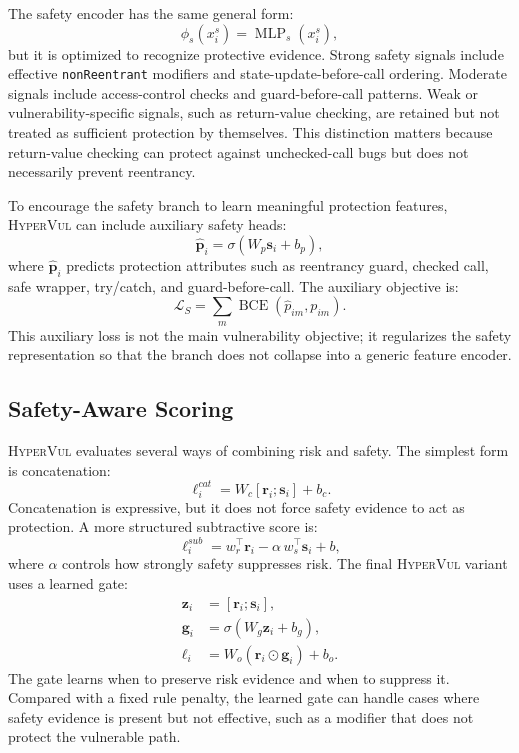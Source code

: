\documentclass[conference]{IEEEtran}
\newcommand{\tool}{\textsc{HyperVul}}
\begin{document}
The safety encoder has the same general form:
\begin{equation}
\phi_s(x_i^s)=\operatorname{MLP}_s(x_i^s),
\end{equation}
but it is optimized to recognize protective evidence. Strong safety signals include effective \texttt{nonReentrant} modifiers and state-update-before-call ordering. Moderate signals include access-control checks and guard-before-call patterns. Weak or vulnerability-specific signals, such as return-value checking, are retained but not treated as sufficient protection by themselves. This distinction matters because return-value checking can protect against unchecked-call bugs but does not necessarily prevent reentrancy.

To encourage the safety branch to learn meaningful protection features, \tool{} can include auxiliary safety heads:
\begin{equation}
\hat{\mathbf{p}}_i=\sigma(W_p\mathbf{s}_i+b_p),
\end{equation}
where $\hat{\mathbf{p}}_i$ predicts protection attributes such as reentrancy guard, checked call, safe wrapper, try/catch, and guard-before-call. The auxiliary objective is:
\begin{equation}
\mathcal{L}_{S}=\sum_m \operatorname{BCE}(\hat{p}_{im},p_{im}).
\end{equation}
This auxiliary loss is not the main vulnerability objective; it regularizes the safety representation so that the branch does not collapse into a generic feature encoder.

\subsection{Safety-Aware Scoring}

\tool{} evaluates several ways of combining risk and safety. The simplest form is concatenation:
\begin{equation}
\ell_i^{cat}=W_c[\mathbf{r}_i;\mathbf{s}_i]+b_c.
\end{equation}
Concatenation is expressive, but it does not force safety evidence to act as protection. A more structured subtractive score is:
\begin{equation}
\ell_i^{sub}=w_r^\top \mathbf{r}_i-\alpha\, w_s^\top \mathbf{s}_i+b,
\end{equation}
where $\alpha$ controls how strongly safety suppresses risk. The final \tool{} variant uses a learned gate:
\begin{align}
\mathbf{z}_i&=[\mathbf{r}_i;\mathbf{s}_i],\\
\mathbf{g}_i&=\sigma(W_g\mathbf{z}_i+b_g),\\
\ell_i&=W_o(\mathbf{r}_i\odot \mathbf{g}_i)+b_o.
\end{align}
The gate learns when to preserve risk evidence and when to suppress it. Compared with a fixed rule penalty, the learned gate can handle cases where safety evidence is present but not effective, such as a modifier that does not protect the vulnerable path.
\end{document}
